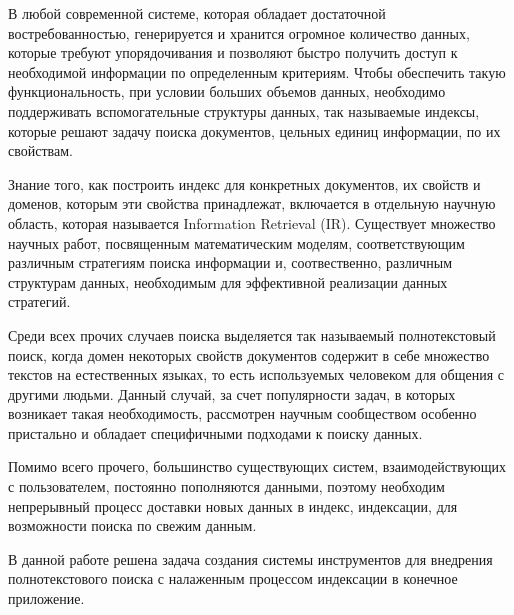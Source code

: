 
В любой современной системе, которая обладает достаточной востребованностью, генерируется и хранится огромное количество данных, которые требуют упорядочивания и позволяют быстро получить доступ к необходимой информации по определенным критериям. Чтобы обеспечить такую функциональность, при условии больших объемов данных, необходимо поддерживать вспомогательные структуры данных, так называемые индексы, которые решают задачу поиска документов, цельных единиц информации, по их свойствам.

Знание того, как построить индекс для конкретных документов, их свойств и доменов, которым эти свойства принадлежат, включается в отдельную научную область, которая называется Information Retrieval (IR). Существует множество научных работ, посвященным математическим моделям, соответствующим различным стратегиям поиска информации и, соотвественно, различным структурам данных, необходимым для эффективной реализации данных стратегий.

Среди всех прочих случаев поиска выделяется так называемый полнотекстовый поиск, когда домен некоторых свойств документов содержит в себе множество текстов на естественных языках, то есть используемых человеком для общения с другими людьми. Данный случай, за счет популярности задач, в которых возникает такая необходимость, рассмотрен научным сообществом особенно пристально и обладает специфичными подходами к поиску данных.

Помимо всего прочего, большинство существующих систем, взаимодействующих с пользователем, постоянно пополняются данными, поэтому необходим непрерывный процесс доставки новых данных в индекс, индексации, для возможности поиска по свежим данным.

В данной работе решена задача создания системы инструментов для внедрения полнотекстового поиска с налаженным процессом индексации в конечное приложение.

\clearpage
